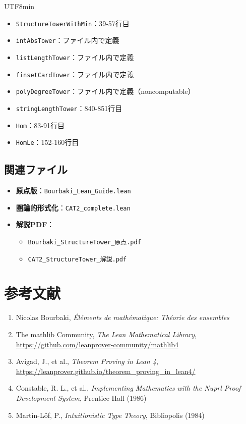 \documentclass[12pt,a4paper]{article}
\theoremstyle{definition}
\theoremstyle{remark}
\begin{document}
\begin{CJK}{UTF8}{min}
\begin{itemize}
\item \texttt{StructureTowerWithMin}：39-57行目
\item \texttt{intAbsTower}：ファイル内で定義
\item \texttt{listLengthTower}：ファイル内で定義
\item \texttt{finsetCardTower}：ファイル内で定義
\item \texttt{polyDegreeTower}：ファイル内で定義（noncomputable）
\item \texttt{stringLengthTower}：840-851行目
\item \texttt{Hom}：83-91行目
\item \texttt{HomLe}：152-160行目
\end{itemize}

\subsection{関連ファイル}

\begin{itemize}
\item \textbf{原点版}：\texttt{Bourbaki\_Lean\_Guide.lean}
\item \textbf{圏論的形式化}：\texttt{CAT2\_complete.lean}
\item \textbf{解説PDF}：
  \begin{itemize}
  \item \texttt{Bourbaki\_StructureTower\_原点.pdf}
  \item \texttt{CAT2\_StructureTower\_解説.pdf}
  \end{itemize}
\end{itemize}

\section{参考文献}

\begin{enumerate}
\item Nicolas Bourbaki, \textit{Éléments de mathématique: Théorie des ensembles}
\item The mathlib Community, \textit{The Lean Mathematical Library}, \url{https://github.com/leanprover-community/mathlib4}
\item Avigad, J., et al., \textit{Theorem Proving in Lean 4}, \url{https://leanprover.github.io/theorem_proving_in_lean4/}
\item Constable, R. L., et al., \textit{Implementing Mathematics with the Nuprl Proof Development System}, Prentice Hall (1986)
\item Martin-Löf, P., \textit{Intuitionistic Type Theory}, Bibliopolis (1984)
\end{enumerate}

\end{CJK}
\end{document}

